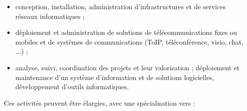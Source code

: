 \medskip
\begin{itemize}[leftmargin=5ex]
\item conception, installation, administration d'infrastructures et de services réseaux informatiques ;
\item déploiement et administration de  solutions de télécommunications fixes ou mobiles et de systèmes de communications (ToIP, téléconférence, visio, chat, ...) ;
\item analyse, suivi, coordination des projets et leur valorisation ;
déploiement et maintenance d'un système d'information et de solutions logicielles, développement d'outils informatiques.
\end{itemize}

\medskip
Ces activités peuvent être élargies, avec une  spécialisation vers : 

